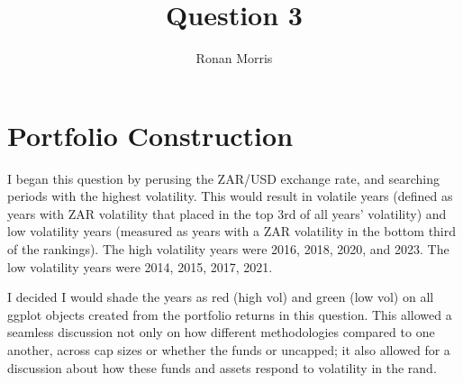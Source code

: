 \documentclass[11pt,preprint, authoryear]{elsarticle}
\numberwithin{equation}{section}
\numberwithin{figure}{section}
\numberwithin{table}{section}
\begin{document}
\begin{frontmatter}  %

\title{Question 3}





\author[Add1]{Ronan Morris}





\address[Add1]{Stellenbosch University}



\vspace{1cm}





\vspace{0.5cm}

\end{frontmatter}

\setcounter{footnote}{0}



\pagestyle{fancy}
\chead{}
\rhead{}
\lfoot{}
\lhead{}
\cfoot{}


\headsep 35pt %




\hypertarget{portfolio-construction}{%
\section{Portfolio Construction}\label{portfolio-construction}}

I began this question by perusing the ZAR/USD exchange rate, and
searching periods with the highest volatility. This would result in
volatile years (defined as years with ZAR volatility that placed in the
top 3rd of all years' volatility) and low volatility years (measured as
years with a ZAR volatility in the bottom third of the rankings). The
high volatility years were 2016, 2018, 2020, and 2023. The low
volatility years were 2014, 2015, 2017, 2021.

I decided I would shade the years as red (high vol) and green (low vol)
on all ggplot objects created from the portfolio returns in this
question. This allowed a seamless discussion not only on how different
methodologies compared to one another, across cap sizes or whether the
funds or uncapped; it also allowed for a discussion about how these
funds and assets respond to volatility in the rand.
\end{document}
